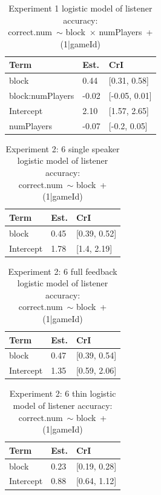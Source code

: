\documentclass[
  english,
  a4paper,
]{article}
\begin{document}
\begin{table}[h!]

\caption{\label{tab:unnamed-chunk-10}Experiment 1 logistic model of listener accuracy:\\ correct.num~$\sim$ block~$\times$ numPlayers~+ (1|gameId)}
\centering
\begin{tabular}[t]{lll}
\toprule
Term & Est. & CrI\\
\midrule
block & 0.44 & {}[0.31, 0.58]\\
block:numPlayers & -0.02 & {}[-0.05, 0.01]\\
Intercept & 2.10 & {}[1.57, 2.65]\\
numPlayers & -0.07 & {}[-0.2, 0.05]\\
\bottomrule
\end{tabular}
\end{table}

\begin{table}[h!]

\caption{\label{tab:unnamed-chunk-10}Experiment 2: 6 single speaker logistic model of listener accuracy:\\ correct.num~$\sim$ block~+ (1|gameId)}
\centering
\begin{tabular}[t]{lll}
\toprule
Term & Est. & CrI\\
\midrule
block & 0.45 & {}[0.39, 0.52]\\
Intercept & 1.78 & {}[1.4, 2.19]\\
\bottomrule
\end{tabular}
\end{table}

\begin{table}[h!]

\caption{\label{tab:unnamed-chunk-10}Experiment 2: 6 full feedback logistic model of listener accuracy:\\ correct.num~$\sim$ block~+ (1|gameId)}
\centering
\begin{tabular}[t]{lll}
\toprule
Term & Est. & CrI\\
\midrule
block & 0.47 & {}[0.39, 0.54]\\
Intercept & 1.35 & {}[0.59, 2.06]\\
\bottomrule
\end{tabular}
\end{table}

\begin{table}[h!]

\caption{\label{tab:unnamed-chunk-10}Experiment 2: 6 thin logistic model of listener accuracy:\\ correct.num~$\sim$ block~+ (1|gameId)}
\centering
\begin{tabular}[t]{lll}
\toprule
Term & Est. & CrI\\
\midrule
block & 0.23 & {}[0.19, 0.28]\\
Intercept & 0.88 & {}[0.64, 1.12]\\
\bottomrule
\end{tabular}
\end{table}
\end{document}

